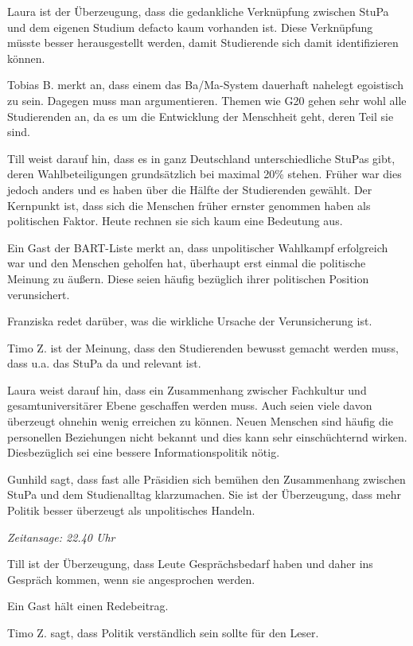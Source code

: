 \documentclass[ngerman,headheight=70pt]{scrartcl}
\begin{document}
    Laura ist der Überzeugung, dass die gedankliche Verknüpfung zwischen StuPa
    und dem eigenen Studium defacto kaum vorhanden ist. Diese Verknüpfung müsste
    besser herausgestellt werden, damit Studierende sich damit identifizieren können.

    Tobias B. merkt an, dass einem das Ba/Ma-System dauerhaft nahelegt
    egoistisch zu sein. Dagegen muss man argumentieren. Themen wie G20 gehen sehr
    wohl alle Studierenden an, da es um die Entwicklung der Menschheit geht, deren
    Teil sie sind.

    Till weist darauf hin, dass es in ganz Deutschland unterschiedliche StuPas gibt,
    deren Wahlbeteiligungen grundsätzlich bei maximal 20\% stehen. Früher war dies
    jedoch anders und es haben über die Hälfte der Studierenden gewählt.
    Der Kernpunkt ist, dass sich die Menschen früher ernster genommen haben als
    politischen Faktor. Heute rechnen sie sich kaum eine Bedeutung aus.

    Ein Gast der BART-Liste merkt an, dass unpolitischer Wahlkampf erfolgreich war
    und den Menschen geholfen hat, überhaupt erst einmal die politische Meinung
    zu äußern. Diese seien häufig bezüglich ihrer politischen Position verunsichert.

    Franziska redet darüber, was die wirkliche Ursache der Verunsicherung ist.

    Timo Z. ist der Meinung, dass den Studierenden bewusst gemacht werden muss,
    dass u.a. das StuPa da und relevant ist.

    Laura weist darauf hin, dass ein Zusammenhang zwischer Fachkultur und
    gesamtuniversitärer Ebene geschaffen werden muss. Auch seien viele davon überzeugt
    ohnehin wenig erreichen zu können. Neuen Menschen sind häufig die personellen
    Beziehungen nicht bekannt und dies kann sehr einschüchternd wirken.
    Diesbezüglich sei eine bessere Informationspolitik nötig.

    Gunhild sagt, dass fast alle Präsidien sich bemühen den Zusammenhang zwischen
    StuPa und dem Studienalltag klarzumachen. Sie ist der Überzeugung, dass
    mehr Politik besser überzeugt als unpolitisches Handeln.

    \textit{Zeitansage: 22.40 Uhr}

    Till ist der Überzeugung, dass Leute Gesprächsbedarf haben und daher ins
    Gespräch kommen, wenn sie angesprochen werden.

    Ein Gast hält einen Redebeitrag.

    Timo Z. sagt, dass Politik verständlich sein sollte für den Leser.
\end{document}

